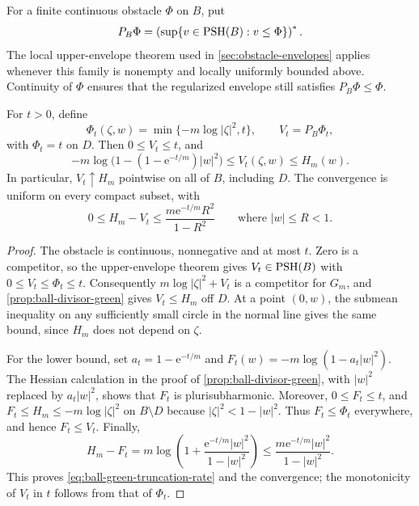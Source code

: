 For a finite continuous obstacle $\Phi$ on $B$, put
\[
 P_B\Phi=\left(\sup\{v\in\mathrm{PSH}(B):v\leq\Phi\}\right)^*.
\]
The local upper-envelope theorem used in \cref{sec:obstacle-envelopes} applies whenever this family is nonempty and locally uniformly bounded above. Continuity of $\Phi$ ensures that the regularized envelope still satisfies $P_B\Phi\leq\Phi$.

\begin{proposition}\label{prop:ball-green-truncation-rate}
For $t>0$, define
\[
 \Phi_t(\zeta,w)=\min\{-m\log|\zeta|^2,t\},
 \qquad V_t=P_B\Phi_t,
\]
with $\Phi_t=t$ on $D$. Then $0\leq V_t\leq t$, and
\begin{equation}\label{eq:ball-green-truncation-squeeze}
 -m\log\bigl(1-(1-\mathrm e^{-t/m})|w|^2\bigr)
 \leq V_t(\zeta,w)\leq H_m(w).
\end{equation}
In particular, $V_t\uparrow H_m$ pointwise on all of $B$, including $D$. The convergence is uniform on every compact subset, with
\begin{equation}\label{eq:ball-green-truncation-rate}
 0\leq H_m-V_t
 \leq \frac{m\mathrm e^{-t/m}R^2}{1-R^2}
 \qquad\text{where }|w|\leq R<1.
\end{equation}
\end{proposition}
\begin{proof}
The obstacle is continuous, nonnegative and at most $t$. Zero is a competitor, so the upper-envelope theorem gives $V_t\in\mathrm{PSH}(B)$ with $0\leq V_t\leq\Phi_t\leq t$. Consequently $m\log|\zeta|^2+V_t$ is a competitor for $G_m$, and \cref{prop:ball-divisor-green} gives $V_t\leq H_m$ off $D$. At a point $(0,w)$, the submean inequality on any sufficiently small circle in the normal line gives the same bound, since $H_m$ does not depend on $\zeta$.

For the lower bound, set $a_t=1-\mathrm e^{-t/m}$ and $F_t(w)=-m\log(1-a_t|w|^2)$. The Hessian calculation in the proof of \cref{prop:ball-divisor-green}, with $|w|^2$ replaced by $a_t|w|^2$, shows that $F_t$ is plurisubharmonic. Moreover, $0\leq F_t\leq t$, and $F_t\leq H_m\leq-m\log|\zeta|^2$ on $B\setminus D$ because $|\zeta|^2<1-|w|^2$. Thus $F_t\leq\Phi_t$ everywhere, and hence $F_t\leq V_t$. Finally,
\[
 H_m-F_t
 =m\log\left(1+\frac{\mathrm e^{-t/m}|w|^2}{1-|w|^2}\right)
 \leq\frac{m\mathrm e^{-t/m}|w|^2}{1-|w|^2}.
\]
This proves \eqref{eq:ball-green-truncation-rate} and the convergence; the monotonicity of $V_t$ in $t$ follows from that of $\Phi_t$.
\end{proof}

